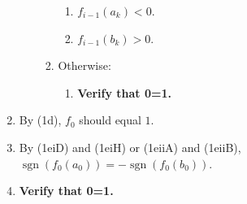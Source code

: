 \documentclass[twocolumn]{article}
\DeclareMathOperator{\sgn}{sgn}
\begin{document}
\begin{enumerate}
\begin{enumerate}
\begin{enumerate}
						\begin{enumerate}
							\item $f_{i-1}(a_k)<0$.
							\item $f_{i-1}(b_k)>0$.
						\end{enumerate}
						\item Otherwise:
						\begin{enumerate}
							\item \textbf{Verify that 0=1.}
						\end{enumerate}
					\end{enumerate}
				\end{enumerate}
				\item By (1d), $f_0$ should equal $1$.
				\item By (1eiD) and (1eiH) or (1eiiA) and (1eiiB), $\sgn(f_0(a_0))=-\sgn(f_0(b_0))$.
				\item \textbf{Verify that 0=1.}
			\end{enumerate}
\end{document}
